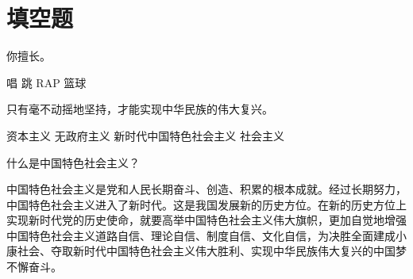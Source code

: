 \documentclass[addpoints,answers]{exam}
\begin{document}
\section{填空题}
\begin{questions}

\question[10] 你擅长\fillin。

\begin{oneparchoices}
\correctchoice 唱
\correctchoice 跳
\correctchoice RAP
\choice 篮球
\end{oneparchoices}

\question[80] 只有毫不动摇地坚持\fillin，才能实现中华民族的伟大复兴。

\begin{choices}
\choice 资本主义
\choice 无政府主义
\correctchoice 新时代中国特色社会主义
\choice 社会主义
\end{choices}

\question[10] 什么是中国特色社会主义？

\begin{solution}
中国特色社会主义是党和人民长期奋斗、创造、积累的根本成就。经过长期努力，中国特色社会主义进入了新时代。这是我国发展新的历史方位。在新的历史方位上实现新时代党的历史使命，就要高举中国特色社会主义伟大旗帜，更加自觉地增强中国特色社会主义道路自信、理论自信、制度自信、文化自信，为决胜全面建成小康社会、夺取新时代中国特色社会主义伟大胜利、实现中华民族伟大复兴的中国梦不懈奋斗。
\end{solution}
\end{questions}
\end{document}
